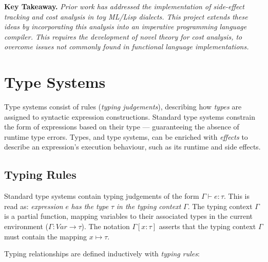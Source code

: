 \vspace{5mm}

\textbf{Key Takeaway.} \textit{Prior work has addressed the implementation of side-effect tracking and cost analysis in toy ML/Lisp dialects. This project extends these ideas by incorporating this analysis into an imperative programming language compiler. This requires the development of novel theory for cost analysis, to overcome issues not commonly found in functional language implementations.}


\section{Type Systems}

\label{sec:2.3}

Type systems consist of rules (\textit{typing judgements}), describing how \textit{types} are assigned to syntactic expression constructions. Standard type systems constrain the form of expressions based on their type --- guaranteeing the absence of runtime type errors. Types, and type systems, can be enriched with \textit{effects} to describe an expression's execution behaviour, such as its runtime and side effects.

\subsection{Typing Rules}

\label{sec:2.3.1}

Standard type systems contain typing judgements of the form \( \Gamma \vdash e : \tau \). This is read as: \textit{expression} \( e \) \textit{has the type} \( \tau \) \textit{in the typing context} \( \Gamma \). The typing context \( \Gamma \) is a partial function, mapping variables to their associated types in the current environment (\( \Gamma : \textit{Var} \rightarrow \tau \)). The notation \( \Gamma[x : \tau] \) asserts that the typing context \( \Gamma \) must contain the mapping \( x \mapsto \tau \).

Typing relationships are defined inductively with \textit{typing rules}:

\begin{prooftree}
\end{prooftree}

